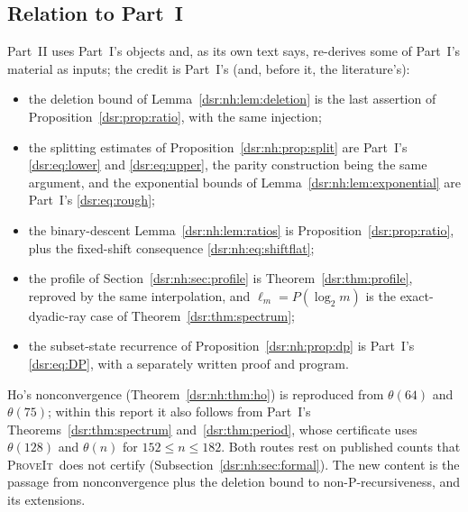 \documentclass[11pt,a4paper]{article}
\numberwithin{equation}{section}
\theoremstyle{definition}
\theoremstyle{remark}
\newcommand{\repo}{\textsc{ProveIt}}
\theoremstyle{definition}
\theoremstyle{plain}
\begin{document}
\subsection{Relation to Part~I}
\label{dsr:nh:sec:relation}
Part~II uses Part~I's objects and, as its own text says, re-derives some of
Part~I's material as inputs; the credit is Part~I's (and, before it, the
literature's):
\begin{itemize}[leftmargin=*,itemsep=2pt]
\item the deletion bound of Lemma~\ref{dsr:nh:lem:deletion} is the last
 assertion of Proposition~\ref{dsr:prop:ratio}, with the same injection;
\item the splitting estimates of Proposition~\ref{dsr:nh:prop:split} are
 Part~I's \eqref{dsr:eq:lower} and \eqref{dsr:eq:upper}, the parity
 construction being the same argument, and the exponential bounds of
 Lemma~\ref{dsr:nh:lem:exponential} are Part~I's \eqref{dsr:eq:rough};
\item the binary-descent Lemma~\ref{dsr:nh:lem:ratios} is
 Proposition~\ref{dsr:prop:ratio}, plus the fixed-shift consequence
 \eqref{dsr:nh:eq:shiftflat};
\item the profile of Section~\ref{dsr:nh:sec:profile} is
 Theorem~\ref{dsr:thm:profile}, reproved by the same interpolation, and
 $\ell_m=P(\log_2m)$ is the exact-dyadic-ray case of
 Theorem~\ref{dsr:thm:spectrum};
\item the subset-state recurrence of Proposition~\ref{dsr:nh:prop:dp} is
 Part~I's \eqref{dsr:eq:DP}, with a separately written proof and program.
\end{itemize}
Ho's nonconvergence (Theorem~\ref{dsr:nh:thm:ho}) is reproduced from
$\theta(64)$ and $\theta(75)$; within this report it also follows from
Part~I's Theorems~\ref{dsr:thm:spectrum} and~\ref{dsr:thm:period}, whose
certificate uses $\theta(128)$ and $\theta(n)$ for $152\le n\le182$. Both
routes rest on published counts that \repo\ does not certify
(Subsection~\ref{dsr:nh:sec:formal}). The new content is the passage from
nonconvergence plus the deletion bound to non-P-recursiveness, and its
extensions.
\end{document}

